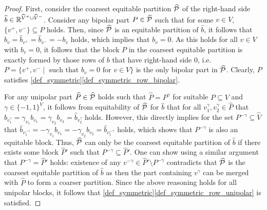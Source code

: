 \documentclass[pdflatex,sn-mathphys-num]{sn-jnl}%
\theoremstyle{thmstyleone}%
\theoremstyle{thmstylethree}%
\theoremstyle{thmstyletwo}%
\begin{document}
\begin{proof}
First, consider the coarsest equitable partition $\widehat{\mathcal{P}}$ of the right-hand side $\widehat{b} \in \mathbb{R}^{\widehat{V}^+\cup \widehat{V}^-}$. Consider any bipolar part $P \in \widehat{\mathcal{P}}$ such that for some $v \in V$, $\{v^+,v^-\} \subseteq P$ holds. Then, since $\widehat{\mathcal{P}}$ is an equitable partition of $\widehat{b}$, it follows that $b_v = \widehat{b}_{v^+} = \widehat{b}_{v^-} = - b_v$ holds, which implies that $b_v = 0$. As this holds for all $v\in V$ with $b_{v} = 0$, it follows that the block $P$ in the coarsest equitable partition is exactly formed by those rows of $b$ that have right-hand side $0$, i.e. $P = \{ v^+,v^- \mid \text{ such that $b_v = 0$ for $v\in V$} \}$ is the only bipolar part in $\widehat{\mathcal{P}}$. Clearly, $P$ satisfies \cref{def_symmetric}\ref{def_symmetric_row_bipolar}. 

For any unipolar part $\widehat{P}\in \widehat{\mathcal{P}}$ holds such that $\widehat{P} = P^\gamma$ for suitable $P \subseteq V$ and $\gamma \in \{-1,1\}^V$, it follows from equitability of $\widehat{\mathcal{P}}$ for $\widehat{b}$ that for all $v^{\gamma}_1,v^\gamma_2\in \widehat{P}$ that $\widehat{b}_{v^\gamma_1} = \gamma_{v_1} b_{v_1} = \gamma_{v_2} b_{v_2} = \widehat{b}_{v^\gamma_2}$ holds. However, this directly implies for the set $P^{-\gamma} \subseteq \widehat{V}$ that $\widehat{b}_{v^{-\gamma}_1} = -\gamma_{v_1} b_{v_1} = -\gamma_{v_2} b_{v_2} = \widehat{b}_{v^{-\gamma}_1}$ holds, which shows that $P^{-\gamma}$ is also an equitable block. Thus, $\widehat{\mathcal{P}}$ can only be the coarsest equitable partition of $\widehat{b}$ if there exists some block $\widehat{P}'$ such that $P^{-\gamma} \subseteq \widehat{P}'$. One can show using a similar argument that $P^{-\gamma} = \widehat{P}'$ holds: existence of any $v^{-\gamma}\in \widehat{P}' \setminus P^{-\gamma}$ contradicts that $\widehat{\mathcal{P}}$ is the coarsest equitable partition of $\widehat{b}$ as then the part containing $v^\gamma$ can be merged with $\widehat{P}$ to form a coarser partition. Since the above reasoning holds for all unipolar blocks, it follows that \cref{def_symmetric}\ref{def_symmetric_row_unipolar} is satisfied.


\end{proof}
\end{document}
